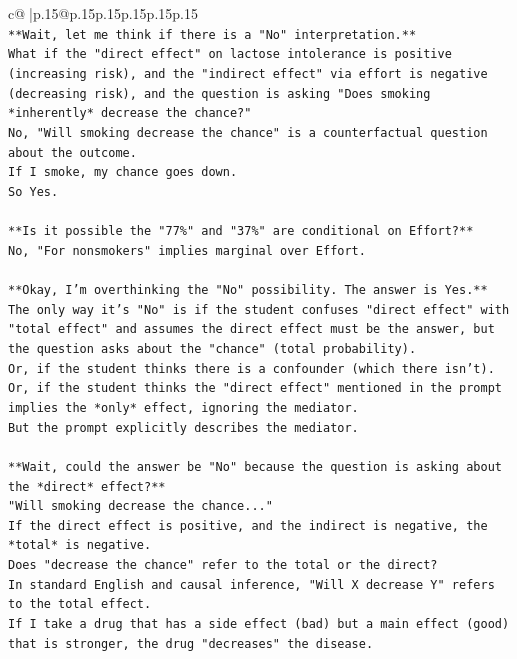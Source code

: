 \documentclass{article}
\begin{document}
{\begin{supertabular}{c@{$\;$}|p{.15\linewidth}@{}p{.15\linewidth}p{.15\linewidth}p{.15\linewidth}p{.15\linewidth}p{.15\linewidth}}
{{{\\ 
\texttt{**Wait, let me think if there is a "No" interpretation.**} \\
\texttt{What if the "direct effect" on lactose intolerance is positive (increasing risk), and the "indirect effect" via effort is negative (decreasing risk), and the question is asking "Does smoking *inherently* decrease the chance?"} \\
\texttt{No, "Will smoking decrease the chance" is a counterfactual question about the outcome.} \\
\texttt{If I smoke, my chance goes down.} \\
\texttt{So Yes.} \\
\\ 
\texttt{**Is it possible the "77\%" and "37\%" are conditional on Effort?**} \\
\texttt{No, "For nonsmokers" implies marginal over Effort.} \\
\\ 
\texttt{**Okay, I'm overthinking the "No" possibility. The answer is Yes.**} \\
\texttt{The only way it's "No" is if the student confuses "direct effect" with "total effect" and assumes the direct effect must be the answer, but the question asks about the "chance" (total probability).} \\
\texttt{Or, if the student thinks there is a confounder (which there isn't).} \\
\texttt{Or, if the student thinks the "direct effect" mentioned in the prompt implies the *only* effect, ignoring the mediator.} \\
\texttt{But the prompt explicitly describes the mediator.} \\
\\ 
\texttt{**Wait, could the answer be "No" because the question is asking about the *direct* effect?**} \\
\texttt{"Will smoking decrease the chance..."} \\
\texttt{If the direct effect is positive, and the indirect is negative, the *total* is negative.} \\
\texttt{Does "decrease the chance" refer to the total or the direct?} \\
\texttt{In standard English and causal inference, "Will X decrease Y" refers to the total effect.} \\
\texttt{If I take a drug that has a side effect (bad) but a main effect (good) that is stronger, the drug "decreases" the disease.} \\
}}}
\end{supertabular}}
\end{document}
